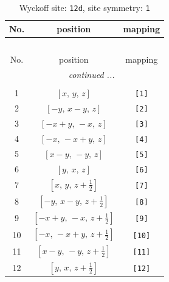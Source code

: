 \documentclass[fleqn,8pt]{jsarticle}
\begin{document}
\begin{longtable}{ccc}
\caption{Wyckoff site: {\tt 12d}, site symmetry: {\tt 1}}
 \\
 \hline \hline
No. & position & mapping \\ \hline \endfirsthead

\multicolumn{2}{l}{\tablename\ \thetable{}} \\
 \hline \hline
No. & position & mapping \\ \hline \endhead

 \hline \hline
\multicolumn{2}{r}{\footnotesize\it continued ...} \\ \endfoot

 \hline \hline
\multicolumn{2}{r}{} \\ \endlastfoot

1 & $\left[ x,\, y,\, z \right]$ & {\tt [1]} \\ \hline
2 & $\left[ - y,\, x - y,\, z \right]$ & {\tt [2]} \\ \hline
3 & $\left[ - x + y,\, - x,\, z \right]$ & {\tt [3]} \\ \hline
4 & $\left[ - x,\, - x + y,\, z \right]$ & {\tt [4]} \\ \hline
5 & $\left[ x - y,\, - y,\, z \right]$ & {\tt [5]} \\ \hline
6 & $\left[ y,\, x,\, z \right]$ & {\tt [6]} \\ \hline
7 & $\left[ x,\, y,\, z + \frac{1}{2} \right]$ & {\tt [7]} \\ \hline
8 & $\left[ - y,\, x - y,\, z + \frac{1}{2} \right]$ & {\tt [8]} \\ \hline
9 & $\left[ - x + y,\, - x,\, z + \frac{1}{2} \right]$ & {\tt [9]} \\ \hline
10 & $\left[ - x,\, - x + y,\, z + \frac{1}{2} \right]$ & {\tt [10]} \\ \hline
11 & $\left[ x - y,\, - y,\, z + \frac{1}{2} \right]$ & {\tt [11]} \\ \hline
12 & $\left[ y,\, x,\, z + \frac{1}{2} \right]$ & {\tt [12]} \\
\end{longtable}
\end{document}
